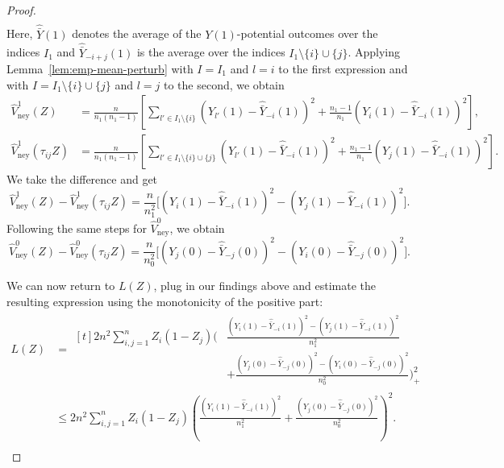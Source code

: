 \documentclass[aos]{imsart2}
\theoremstyle{plain}
\theoremstyle{definition}
\newcommand{\yb}{\bar{Y}}
\newcommand{\ybh}{\hat{\bar{Y}}}
\newcommand{\vhn}{\hat{V}_{\mathrm{ney}}}
\begin{document}
\begin{appendix}
\begin{proof}
\begin{align*}
    \end{align*}
    Here, $\ybh(1)$ denotes the average of the $Y(1)$-potential outcomes over the indices $I_1$ and $\ybh_{-i+j}(1)$ is the average over the indices $I_1\setminus\{i\} \cup \{j\}$. Applying Lemma~\ref{lem:emp-mean-perturb} with $I = I_1$ and $l=i$ to the first expression and with $I=I_1 \setminus \{i\} \cup \{j\}$ and $l=j$ to the second, we obtain
    \begin{align*}
        \vhn^1(Z) &= \frac{n}{n_1(n_1-1)}\left[\sum_{l' \in I_1 \setminus\{i\}} (Y_{l'}(1)-\ybh_{-i}(1))^2 + \frac{n_1-1}{n_1}(Y_i(1)-\ybh_{-i}(1))^2\right],\\
        \vhn^1(\tau_{ij}Z) &= \frac{n}{n_1(n_1-1)} \left[\sum_{l' \in I_1 \setminus \{i\} \cup \{j\}} (Y_{l'}(1)-\ybh_{-i}(1))^2 + \frac{n_1-1}{n_1} (Y_j(1)-\ybh_{-i}(1))^2\right].
    \end{align*}
    We take the difference and get
    \begin{equation*}
        \vhn^1(Z) - \vhn^1(\tau_{ij}Z) = \frac{n}{n_1^2}\Big[(Y_i(1)-\ybh_{-i}(1))^2-(Y_j(1)-\ybh_{-i}(1))^2\Big].
    \end{equation*}
    Following the same steps for $\vhn^0$, we obtain
    \begin{equation*}
        \vhn^0(Z) - \vhn^0(\tau_{ij}Z) = \frac{n}{n_0^2}\Big[(Y_j(0)-\ybh_{-j}(0))^2-(Y_i(0)-\ybh_{-j}(0))^2\Big].
    \end{equation*}

    We can now return to $L(Z)$, plug in our findings above and estimate the resulting expression using the monotonicity of the positive part:
    \begin{align*}
        L(Z) &= \begin{aligned}[t]
            2 n^2 \sum_{i,j=1}^n Z_i (1-Z_j) \bigg(&\frac{(Y_i(1)-\ybh_{-i}(1))^2-(Y_j(1)-\ybh_{-i}(1))^2}{n_1^2}\\
            &+ \frac{(Y_j(0)-\ybh_{-j}(0))^2-(Y_i(0)-\ybh_{-j}(0))^2}{n_0^2}\bigg)_+^2
        \end{aligned}\\[1ex]
        &\leq 2 n^2 \sum_{i,j=1}^n Z_i (1-Z_j) \left(\frac{(Y_i(1)-\ybh_{-i}(1))^2}{n_1^2}
            + \frac{(Y_j(0)-\ybh_{-j}(0))^2}{n_0^2}\right)^2.\\
    \end{align*}
     

\end{proof}
\end{appendix}
\end{document}

